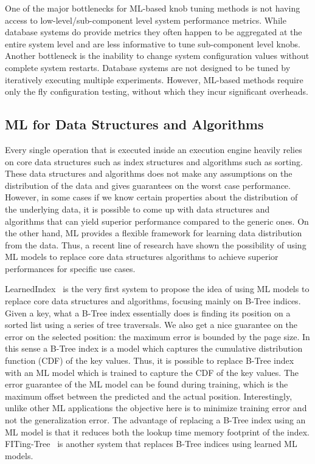 One of the major bottlenecks for ML-based knob tuning methods is not having access to low-level/sub-component level system performance metrics.
While database systems do provide metrics they often happen to be aggregated at the entire system level and are less informative to tune sub-component level knobs.
Another bottleneck is the inability to change system configuration values without complete system restarts.
Database systems are not designed to be tuned by iteratively executing multiple experiments. 
However, ML-based methods require only the fly configuration testing, without which they incur significant overheads.

\subsection{ML for Data Structures and Algorithms}
Every single operation that is executed inside an execution engine heavily relies on core data structures such as index structures and algorithms such as sorting.
These data structures and algorithms does not make any assumptions on the distribution of the data and gives guarantees on the worst case performance.
However, in some cases if we know certain properties about the distribution of the underlying data, it is possible to come up with data structures and algorithms that can yield superior performance compared to the generic ones.
On the other hand, ML provides a flexible framework for learning data distribution from the data.
Thus, a recent line of research have shown the possibility of using ML models to replace core data structures algorithms to achieve superior performances for specific use cases.

LearnedIndex~\cite{learnedindex} is the very first system to propose the idea of using ML models to replace core data structures and algorithms, focusing mainly on B-Tree indices. 
Given a key, what a B-Tree index essentially does is finding its position on a sorted list using a series of tree traversals.
We also get a nice guarantee on the error on the selected position: the maximum error is bounded by the page size.
In this sense a B-Tree index is a model which captures the cumulative distribution function (CDF) of the key values.
Thus, it is possible to replace B-Tree index with an ML model which is trained to capture the CDF of the key values.
The error guarantee of the ML model can be found during training, which is the maximum offset between the predicted and the actual position.
Interestingly, unlike other ML applications the objective here is to minimize training error and not the generalization error.
The advantage of replacing a B-Tree index using an ML model is that it reduces both the lookup time memory footprint of the index.
FITing-Tree~\cite{fitingtree} is another system that replaces B-Tree indices using learned ML models.


